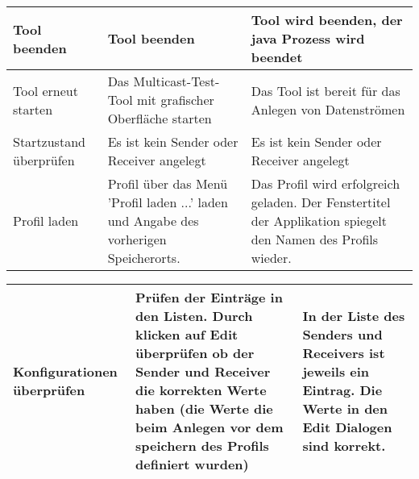 \begin{table}[h]
\begin{center}
\begin{tabular}{|p{3.5cm}|p{5cm}|p{6.55cm}|}
                    \\
                \hline
                    Tool beenden &
                    Tool beenden &
                    Tool wird beenden, der java Prozess wird beendet\\
                \hline
                    Tool erneut starten &
                    Das Multicast-Test-Tool mit grafischer Oberfläche starten & 
                    Das Tool ist bereit für das Anlegen von Datenströmen \\
                \hline
                    Startzustand überprüfen &
                    Es ist kein Sender oder Receiver angelegt & 
                    Es ist kein Sender oder Receiver angelegt \\
                \hline
                    Profil laden &
                    Profil über das Menü 'Profil laden ...' laden und Angabe des 
                    vorherigen Speicherorts. & 
                    Das Profil wird erfolgreich geladen. Der Fenstertitel der 
                    Applikation spiegelt den Namen des Profils wieder.\\
                \hline
            \end{tabular}
        \end{center}
    \end{table}
    
    \begin{table}[h]
        \begin{center}
           \begin{tabular}{|p{3.5cm}|p{5cm}|p{6.55cm}|}
                \hline
                    Konfigurationen überprüfen &
                    Prüfen der Einträge in den Listen.
                    Durch klicken auf Edit überprüfen ob der Sender und Receiver
                    die korrekten Werte haben (die Werte die beim Anlegen vor
                    dem speichern des Profils definiert wurden) & 
                    In der Liste des Senders und Receivers ist jeweils ein Eintrag.
                    Die Werte in den Edit Dialogen sind korrekt.\\
                \hline
            \end{tabular}
        \end{center}
    \end{table}



